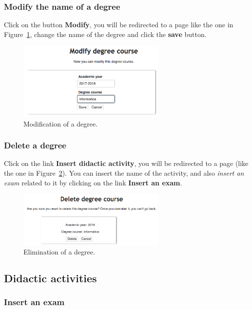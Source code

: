 \subsubsection{Modify the name of a degree}
Click on the button \textbf{Modify}, you will be redirected to a page like the one in Figure~\ref{fig:modifyDegree}, change the name
of the degree and click the \textbf{save} button.
\begin{figure}[!h]
  \centering
  \includegraphics[width=0.65\textwidth]{img/modifyDegree.png}
  \caption{Modification of a degree.}
  \label{fig:modifyDegree}
\end{figure}

\subsubsection{Delete a degree}
Click on the link \textbf{Insert didactic activity}, you will be redirected to a page (like the one in Figure~\ref{fig:deleteDegree}). You can insert the name of the activity, and also \emph{insert an exam} related to it by clicking on the link \textbf{Insert an exam}.
\begin{figure}[!h]
  \centering
  \includegraphics[width=0.65\textwidth]{img/deleteDegree.png}
  \caption{Elimination of a degree.}
  \label{fig:deleteDegree}
\end{figure}

\subsection{Didactic activities}
\WarningSubsection
\subsubsection{Insert an exam}
\WarningSubsection
